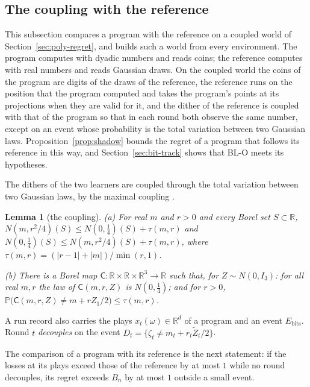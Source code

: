 \documentclass[11pt]{amsart}
\newtheorem{lemma}[theorem]{Lemma}
\theoremstyle{definition}
\numberwithin{equation}{section}
\newcommand{\R}{\mathbb{R}}
\newcommand{\Prob}{\mathbb{P}}
\begin{document}
\subsection{The coupling with the reference}\label{sec:bit-shadow}

This subsection compares a program with the reference on a coupled world of Section~\ref{sec:poly-regret}, and builds such a world from every environment. The program computes with dyadic numbers and reads coins; the reference computes with real numbers and reads Gaussian draws. On the coupled world the coins of the program are digits of the draws of the reference, the reference runs on the position that the program computed and takes the program's points at its projections when they are valid for it, and the dither of the reference is coupled with that of the program so that in each round both observe the same number, except on an event whose probability is the total variation between two Gaussian laws. Proposition~\ref{prop:shadow} bounds the regret of a program that follows its reference in this way, and Section~\ref{sec:bit-track} shows that BL-O meets its hypotheses.

The dithers of the two learners are coupled through the total variation between two Gaussian laws, by the maximal coupling \cite[Chapter~1, Theorem~4.4]{Tho00}.

\begin{lemma}[the coupling]\label{lem:coup}
(a) For real $m$ and $r>0$ and every Borel set $S\subset\R$, $N(m,r^2/4)(S)\le N(0,\frac14)(S)+\tau(m,r)$ and $N(0,\frac14)(S)\le N(m,r^2/4)(S)+\tau(m,r)$, where $\tau(m,r)=(|r-1|+|m|)/\min(r,1)$.

(b) There is a Borel map $\mathsf C:\R\times\R\times\R^3\to\R$ such that, for $Z\sim N(0,I_3)$: for all real $m,r$ the law of $\mathsf C(m,r,Z)$ is $N(0,\frac14)$; and for $r>0$, $\Prob\bigl(\mathsf C(m,r,Z)\ne m+rZ_1/2\bigr)\le\tau(m,r)$.
\end{lemma}

A run record also carries the plays $x_t(\omega)\in\R^d$ of a program and an event $E_{\mathrm{bits}}$. Round $t$ \emph{decouples} on the event $D_t=\{\zeta_t\ne m_t+r_t\tilde Z_t/2\}$.

The comparison of a program with its reference is the next statement: if the losses at its plays exceed those of the reference by at most $1$ while no round decouples, its regret exceeds $B_n$ by at most $1$ outside a small event.
\end{document}
